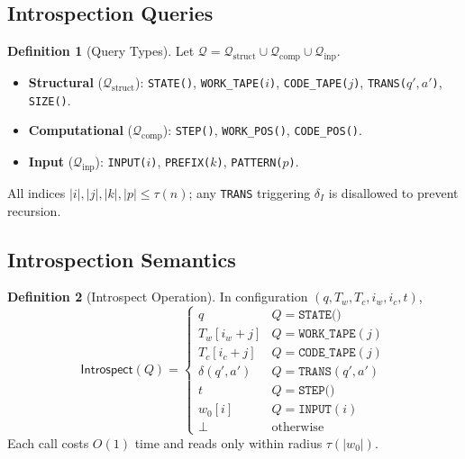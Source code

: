 \documentclass[12pt]{article}
\newcommand{\struct}{\mathrm{struct}}
\newcommand{\comp}{\mathrm{comp}}
\newcommand{\inp}{\mathrm{inp}}
\theoremstyle{definition}
\newtheorem{definition}{Definition}[section]
\theoremstyle{plain}
\begin{document}
\subsection{Introspection Queries}

\begin{definition}[Query Types]
Let \(\mathcal{Q}=\mathcal{Q}_{\struct}\cup\mathcal{Q}_{\comp}\cup\mathcal{Q}_{\inp}\).  
\begin{itemize}
  \item \textbf{Structural} (\(\mathcal{Q}_{\struct}\)): 
    \texttt{STATE()}, \texttt{WORK\_TAPE(\(i\))}, \texttt{CODE\_TAPE(\(j\))},
    \texttt{TRANS(\(q',a'\))}, \texttt{SIZE()}.
  \item \textbf{Computational} (\(\mathcal{Q}_{\comp}\)): 
    \texttt{STEP()}, \texttt{WORK\_POS()}, \texttt{CODE\_POS()}.
  \item \textbf{Input} (\(\mathcal{Q}_{\inp}\)): 
    \texttt{INPUT(\(i\))}, \texttt{PREFIX(\(k\))}, \texttt{PATTERN(\(p\))}.
\end{itemize}
All indices \(\lvert i\rvert,\lvert j\rvert,\lvert k\rvert,\lvert p\rvert\le\tau(n)\);
any \texttt{TRANS} triggering \(\delta_I\) is disallowed to prevent recursion.
\end{definition}

\subsection{Introspection Semantics}

\begin{definition}[Introspect Operation]
In configuration \((q,T_w,T_c,i_w,i_c,t)\),
\[
  \mathsf{Introspect}(Q)
  = 
  \begin{cases}
    q                            & Q=\texttt{STATE()}\\
    T_w[i_w+j]                   & Q=\texttt{WORK\_TAPE}(j)\\
    T_c[i_c+j]                   & Q=\texttt{CODE\_TAPE}(j)\\
    \delta(q',a')                & Q=\texttt{TRANS}(q',a')\\
    t                            & Q=\texttt{STEP()}\\
    w_0[i]                       & Q=\texttt{INPUT}(i)\\
    \bot                         & \text{otherwise}
  \end{cases}
\]
Each call costs \(O(1)\) time and reads only within radius \(\tau(|w_0|)\).
\end{definition}
\end{document}
